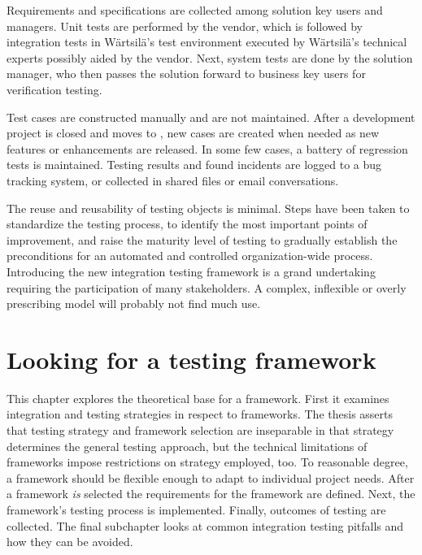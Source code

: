 \documentclass[12pt,a4paper,oneside,pdftex]{report}
\begin{document}
Requirements and specifications are collected among solution key users and managers. Unit tests are performed by the vendor, which is followed by integration tests in Wärtsilä's test environment executed by Wärtsilä's technical experts possibly aided by the vendor. Next, system tests are done by the solution manager, who then passes the solution forward to business key users for verification testing. %

Test cases are constructed manually and are not maintained. After a development project is closed and moves to , new cases are created when needed as new features or enhancements are released. In some few cases, a battery of regression tests is maintained. Testing results and found incidents are logged to a bug tracking system, or collected in shared files or email conversations. 

The reuse and reusability of testing objects is minimal. Steps have been taken to standardize the testing process, to identify the most important points of improvement, and raise the maturity level of testing to gradually establish the preconditions for an automated and controlled organization-wide process. Introducing the new integration testing framework is a grand undertaking requiring the participation of many stakeholders. A complex, inflexible or overly prescribing model will probably not find much use.

\chapter{Looking for a testing framework}
\label{chapter:integrationtesting} %

This chapter explores the theoretical base for a framework. First it examines integration and testing strategies in respect to frameworks. The thesis asserts that testing strategy and framework selection are inseparable in that strategy determines the general testing approach, but the technical limitations of frameworks impose restrictions on strategy employed, too. To reasonable degree, a framework should be flexible enough to adapt to individual project needs. After a framework \emph{is} selected the requirements for the framework are defined. Next, the framework's testing process is implemented. Finally, outcomes of testing are collected. The final subchapter looks at common integration testing pitfalls and how they can be avoided.
\end{document}

